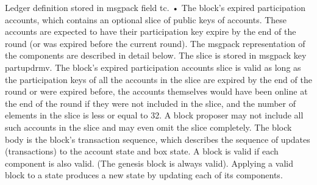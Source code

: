 \documentclass[10pt,a4paper]{article}
\begin{document}
\begin{section}{Ledger definition}
stored in msgpack field tc.
• The block’s expired participation accounts, which contains an optional slice
of public keys of accounts. These accounts are expected to have their
participation key expire by the end of the round (or was expired before
the current round). The msgpack representation of the components are
described in detail below. The slice is stored in msgpack key partupdrmv.
The block’s expired participation accounts slice is valid as long as the participation
keys of all the accounts in the slice are expired by the end of the round or were
expired before, the accounts themselves would have been online at the end of
the round if they were not included in the slice, and the number of elements
in the slice is less or equal to 32. A block proposer may not include all such
accounts in the slice and may even omit the slice completely.
The block body is the block’s transaction sequence, which describes the sequence
of updates (transactions) to the account state and box state.
A block is valid if each component is also valid. (The genesis block is always
valid). Applying a valid block to a state produces a new state by updating each
of its components.
\end{section}
\end{document}

